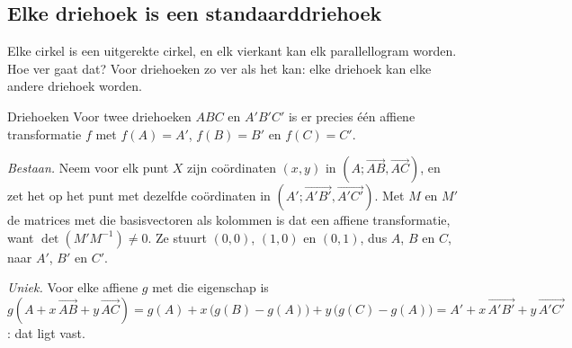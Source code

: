 
\begin{oefeningen}
\end{oefeningen}

\subsection{Elke driehoek is een standaarddriehoek}

Elke cirkel is een uitgerekte cirkel, en elk vierkant kan elk parallellogram worden. Hoe ver gaat dat? Voor driehoeken zo ver als het kan: elke driehoek kan elke andere driehoek worden.

\begin{theorie}
\begin{stelling}{Driehoeken}
Voor twee driehoeken $ABC$ en $A'B'C'$ is er precies één affiene transformatie $f$ met $f(A) = A'$, $f(B) = B'$ en $f(C) = C'$.
\end{stelling}

\begin{bewijs}
\textit{Bestaan.} Neem voor elk punt $X$ zijn coördinaten $(x, y)$ in $(A; \vec{AB}, \vec{AC})$, en zet het op het punt met dezelfde coördinaten in $(A'; \vec{A'B'}, \vec{A'C'})$. Met $M$ en $M'$ de matrices met die basisvectoren als kolommen is dat
een affiene transformatie, want $\det(M'M^{-1}) \neq 0$. Ze stuurt $(0, 0)$, $(1, 0)$ en $(0, 1)$, dus $A$, $B$ en $C$, naar $A'$, $B'$ en $C'$.

\textit{Uniek.} Voor elke affiene $g$ met die eigenschap is $g(A + x\,\vec{AB} + y\,\vec{AC}) = g(A) + x\,\bigl(g(B) - g(A)\bigr) + y\,\bigl(g(C) - g(A)\bigr) = A' + x\,\vec{A'B'} + y\,\vec{A'C'}$: dat ligt vast.
\end{bewijs}
\end{theorie}


